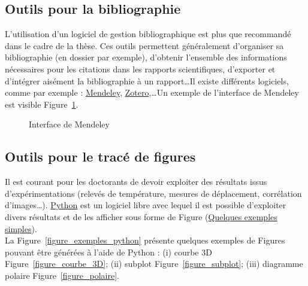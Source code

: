 \documentclass[a4paper,12pt]{report}
\begin{document}
\FloatBarrier
\subsection{Outils pour la bibliographie}

L'utilisation d'un logiciel de gestion bibliographique est plus que recommandé dans le cadre de la thèse. Ces outils permettent généralement d'organiser sa bibliographie (en dossier par exemple), d'obtenir l'ensemble des informations nécessaires pour les citations dans les rapports scientifiques, d'exporter et d'intégrer aisément la bibliographie à un rapport\ldots Il existe différents logiciels, comme par exemple : \href{https://www.mendeley.com/}{Mendeley}, \href{https://www.zotero.org/}{Zotero},\ldots Un exemple de l'interface de Mendeley est visible Figure~\ref{figure_mendeley}.


\begin{figure}[hbtp]
	\centering
	\def\svgwidth{1\columnwidth}
	\fontsize{10pt}{10pt}\selectfont
	\caption{Interface de Mendeley}
	\label{figure_mendeley}
\end{figure}


\FloatBarrier
\subsection{Outils pour le tracé de figures}

Il est courant pour les doctorants de devoir exploiter des résultats issus d'expérimentations (relevés de température, mesures de déplacement, corrélation d'images\ldots). \href{https://www.anaconda.com/download/}{Python} est un logiciel libre avec lequel il est possible d'exploiter divers résultats et de les afficher sous forme de Figure (\href{https://github.com/JeanCollomb/Python_plot}{Quelques exemples simples}). \\

La Figure~\ref{figure_exemples_python} présente quelques exemples de Figures pouvant être générées à l'aide de Python : (i) courbe 3D Figure~\ref{figure_courbe_3D}; (ii) subplot Figure~\ref{figure_subplot}; (iii) diagramme polaire Figure~\ref{figure_polaire}.
\end{document}

